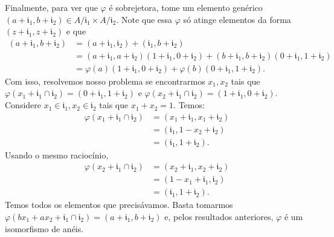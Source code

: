 \documentclass[AlgebraII/algebraII_notes.tex]{subfiles}
\begin{document}
\begin{proof*}
	Finalmente, para ver que \(\varphi \) é sobrejetora, tome um elemento genérico \((a+\mathfrak{i}_{1}, b+\mathfrak{i}_{2})\in A/\mathfrak{i}_{1}\times A/\mathfrak{i}_{2}.\)
	Note que essa \(\varphi \) só atinge elementos da forma \((z + \mathfrak{i}_{1}, z + \mathfrak{i}_{2})\) e que
	\begin{align*}
		(a+\mathfrak{i}_{1}, b+\mathfrak{i}_{2}) & = (a+\mathfrak{i}_{1}, \mathfrak{i}_{2}) + (\mathfrak{i}_{1}, b + \mathfrak{i}_{2})                                                                                         \\
		                                         & = (a+\mathfrak{i}_{1}, a + \mathfrak{i}_{2})(1+\mathfrak{i}_{1}, 0 + \mathfrak{i}_{2}) + (b+\mathfrak{i}_{1}, b+\mathfrak{i}_{2})(0+\mathfrak{i}_{1}, 1 + \mathfrak{i}_{2}) \\
		                                         & = \varphi(a)(1+\mathfrak{i}_{1}, 0 + \mathfrak{i}_{2}) + \varphi(b)(0+\mathfrak{i}_{1}, 1 + \mathfrak{i}_{2}).
	\end{align*}
	Com isso, resolvemos nosso problema se encontrarmos \(x_{1}, x_{2}\) tais que \(\varphi (x_{1}+\mathfrak{i}_{1}\cap \mathfrak{i}_{2}) = (0 +\mathfrak{i}_{1}, 1 +\mathfrak{i}_{2})\) e
	\(\varphi (x_{2} + \mathfrak{i}_{1}\cap \mathfrak{i}_{2}) = (1+\mathfrak{i}_{1}, 0+\mathfrak{i}_{2}).\) Considere
	\(x_{1}\in \mathfrak{i}_{1}, x_{2}\in \mathfrak{i}_{2}\) tais que \(x_{1} + x_{2} = 1.\) Temos:
	\begin{align*}
		\varphi (x_{1}+\mathfrak{i}_{1}\cap \mathfrak{i}_{2}) & = (x_{1}+\mathfrak{i}_{1}, x_{1}+\mathfrak{i}_{2}) \\
		                                                      & = (\mathfrak{i}_{1}, 1 - x_{2} + \mathfrak{i}_{2}) \\
		                                                      & = (\mathfrak{i}_{1}, 1+\mathfrak{i}_{2}).
	\end{align*}
	Usando o mesmo raciocínio,
	\begin{align*}
		\varphi (x_{2} + \mathfrak{i}_{1}\cap \mathfrak{i}_{2}) & = (x_{2}+\mathfrak{i}_{1}, x_{2}+\mathfrak{i}_{2}) \\
		                                                        & = (1-x_{1}+\mathfrak{i}_{1}, \mathfrak{i}_{2})     \\
		                                                        & = (\mathfrak{i}_{1}, 1 + \mathfrak{i}_{2}).
	\end{align*}
	Temos todos os elementos que precisávamos. Basta tomarmos \(\varphi (bx_{1} + ax_{2} + \mathfrak{i}_{1}\cap \mathfrak{i}_{2}) = (a+\mathfrak{i}_{1}, b+\mathfrak{i}_{2})\) e, pelos resultados anteriores,
	\(\varphi \) é um isomorfismo de anéis.


\end{proof*}
\end{document}

